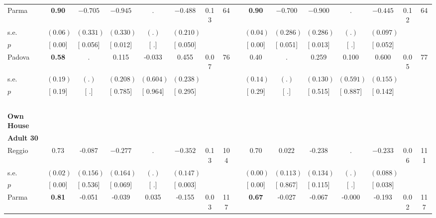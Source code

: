 \begin{longtable}{L{8em} c c c c c c c p{1em} c c c c c c c}
\quad \quad \quad Parma& \textbf{     0.90} & $ \mathbf{   -0.705}$ & $ \mathbf{   -0.945}$ &         . & $ \mathbf{   -0.488}$ &      0.13 &        64 & & \textbf{     0.90} & $ \mathbf{   -0.700}$ & $ \mathbf{   -0.900}$ &         . & $ \mathbf{   -0.445}$ &      0.12 &        64  \\*
\quad \quad \quad \quad s.e.& $ (     0.06)$ & $ (    0.331)$ & $ (    0.330)$ & $ (        .)$ & $ (    0.210)$ & & & & $ (     0.04)$ & $ (    0.286)$ & $ (    0.286)$ & $ (        .)$ & $ (    0.097)$ & &  \\*
\quad \quad \quad \quad $ p$ & [     0.00] & [    0.056] & [    0.012] & [        .] & [    0.050] & & & & [     0.00] & [    0.051] & [    0.013] & [        .] & [    0.052] & &  \\[1em]
\quad \quad \quad Padova& \textbf{     0.58} &         . &     0.115 &    -0.033 &     0.455 &      0.07 &        76 & & 0.40 &         . &     0.259 &     0.100 &     0.600 &      0.05 &        77  \\*
\quad \quad \quad \quad s.e.& $ (     0.19)$ & $ (        .)$ & $ (    0.208)$ & $ (    0.604)$ & $ (    0.238)$ & & & & $ (     0.14)$ & $ (        .)$ & $ (    0.130)$ & $ (    0.591)$ & $ (    0.155)$ & &  \\*
\quad \quad \quad \quad $ p$ & [     0.19] & [        .] & [    0.785] & [    0.964] & [    0.295] & & & & [     0.29] & [        .] & [    0.515] & [    0.887] & [    0.142] & &  \\[1em]
~\\[1em]
\textbf{Own House} \\*
\quad \quad \textbf{Adult 30} & & & & & & & & & & & & & & & \\* 
\quad \quad \quad Reggio& 0.73 &    -0.087 & $ \mathbf{   -0.277}$ &         . & $ \mathbf{   -0.352}$ &      0.13 &       104 & & 0.70 &     0.022 &    -0.238 &         . & $ \mathbf{   -0.233}$ &      0.06 &       111  \\*
\quad \quad \quad \quad s.e.& $ (     0.02)$ & $ (    0.156)$ & $ (    0.164)$ & $ (        .)$ & $ (    0.147)$ & & & & $ (     0.00)$ & $ (    0.113)$ & $ (    0.134)$ & $ (        .)$ & $ (    0.088)$ & &  \\*
\quad \quad \quad \quad $ p$ & [     0.00] & [    0.536] & [    0.069] & [        .] & [    0.003] & & & & [     0.00] & [    0.867] & [    0.115] & [        .] & [    0.038] & &  \\[1em]
\quad \quad \quad Parma& \textbf{     0.81} &    -0.051 &    -0.039 &     0.035 &    -0.155 &      0.03 &       117 & & \textbf{     0.67} &    -0.027 &    -0.067 &    -0.000 &    -0.193 &      0.02 &       117  \\*

\end{longtable}
